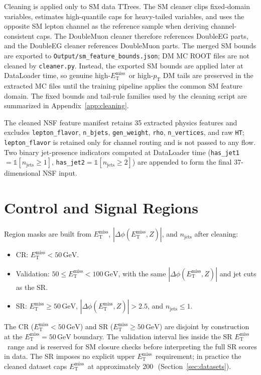 \documentclass[11pt,a4paper,twocolumn]{article}
\newcommand{\GeV}{\text{GeV}}
\newcommand{\MET}{\ensuremath{E_{\mathrm{T}}^{\mathrm{miss}}}}
\begin{document}
Cleaning is applied only to SM data TTrees. The SM cleaner clips fixed-domain variables,
estimates high-quantile caps for heavy-tailed variables, and uses the opposite SM lepton
channel as the reference sample when deriving channel-consistent caps. The DoubleMuon
cleaner therefore references DoubleEG parts, and the DoubleEG cleaner references
DoubleMuon parts. The merged SM bounds are exported to
\texttt{Output/sm\_feature\_bounds.json}; DM MC ROOT files are not cleaned by
\texttt{cleaner.py}. Instead, the exported SM bounds are applied later at DataLoader time,
so genuine high-\MET\ or high-$p_{\mathrm{T}}$ DM tails are preserved in the extracted MC
files until the training pipeline applies the common SM feature domain. The fixed bounds
and tail-rule families used by the cleaning script are summarized in
Appendix~\ref{app:cleaning}.

The cleaned NSF feature manifest retains 35 extracted physics features and excludes
\texttt{lepton\_flavor}, \texttt{n\_bjets}, \texttt{gen\_weight}, \texttt{rho},
\texttt{n\_vertices}, and raw \texttt{HT}; \texttt{lepton\_flavor} is retained only for
channel routing and is not passed to any flow.
Two binary jet-presence indicators computed at DataLoader time
(\texttt{has\_jet1}$=\mathbb{1}[n_\mathrm{jets}\ge 1]$,
\texttt{has\_jet2}$=\mathbb{1}[n_\mathrm{jets}\ge 2]$) are appended to form the final
37-dimensional NSF input.

\section{Control and Signal Regions}
\label{sec:regions}

Region masks are built from \MET, $|\Delta\phi(\MET,Z)|$, and $n_{\mathrm{jets}}$ after
cleaning:
\begin{itemize}
  \item CR: $\MET < 50\,\GeV$.
  \item Validation: $50 \le \MET < 100\,\GeV$, with the same
        $|\Delta\phi(\MET,Z)|$ and jet cuts as the SR.
  \item SR: $\MET \ge 50\,\GeV$, $|\Delta\phi(\MET,Z)| > 2.5$, and
        $n_{\mathrm{jets}}\le 1$.
\end{itemize}
The CR ($\MET<50\,\GeV$) and SR ($\MET\ge 50\,\GeV$) are disjoint by construction at the
$\MET=50\,\GeV$ boundary.
The validation interval lies inside the SR \MET\ range and is reserved for SM closure
checks before interpreting the full SR scores in data.
The SR imposes no explicit upper \MET\ requirement; in practice the
cleaned dataset caps \MET\ at approximately 200\,\GeV\
(Section~\ref{sec:datasets}).
\end{document}

